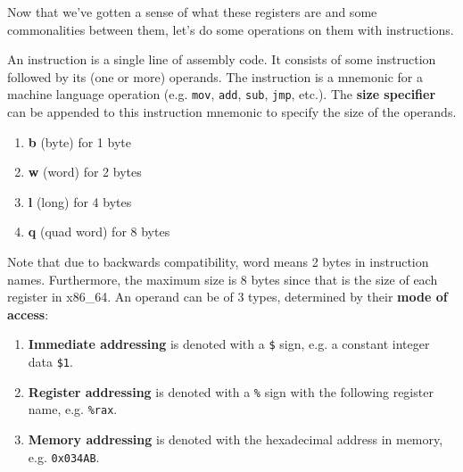 \documentclass{article}
\begin{document}
      Now that we've gotten a sense of what these registers are and some commonalities between them, let's do some operations on them with instructions. 

      \begin{definition}[Instruction]
        An instruction is a single line of assembly code. It consists of some instruction followed by its (one or more) operands. The instruction is a mnemonic for a machine language operation (e.g. \texttt{mov}, \texttt{add}, \texttt{sub}, \texttt{jmp}, etc.). The \textbf{size specifier} can be appended to this instruction mnemonic to specify the size of the operands. 
        \begin{enumerate} 
          \item \textbf{b} (byte) for 1 byte 
          \item \textbf{w} (word) for 2 bytes
          \item \textbf{l} (long) for 4 bytes 
          \item \textbf{q} (quad word) for 8 bytes
        \end{enumerate}
        Note that due to backwards compatibility, word means 2 bytes in instruction names. Furthermore, the maximum size is 8 bytes since that is the size of each register in x86\_64. An operand can be of 3 types, determined by their \textbf{mode of access}:
        \begin{enumerate} 
          \item \textbf{Immediate addressing} is denoted with a \texttt{\$} sign, e.g. a constant integer data \texttt{\$1}. 
          \item \textbf{Register addressing} is denoted with a \texttt{\%} sign with the following register name, e.g. \texttt{\%rax}.
          \item \textbf{Memory addressing} is denoted with the hexadecimal address in memory, e.g. \texttt{0x034AB}.
        \end{enumerate}
      \end{definition}
\end{document}
